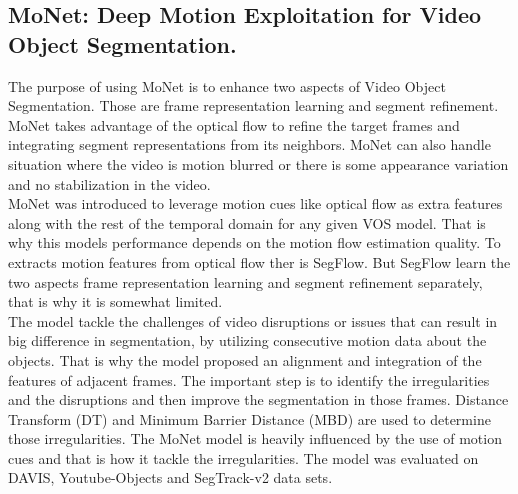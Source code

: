 \documentclass[conference]{IEEEtran}
\begin{document}
\subsection{MoNet: Deep Motion Exploitation for Video Object Segmentation.}
The purpose of using MoNet\cite{Xiao_2018_CVPR} is to enhance two aspects of Video Object Segmentation. Those are frame representation learning and segment refinement. MoNet takes advantage of the optical flow to refine the target frames and integrating segment representations from its neighbors. MoNet can also handle situation where the video is motion blurred or there is some appearance variation and no stabilization in the video. \\
MoNet was introduced to leverage motion cues like optical flow as extra features along with the rest of the temporal domain for any given VOS model. That is why this models performance depends on the motion flow estimation quality. To extracts motion features from optical flow ther is SegFlow\cite{cheng2017segflow}. But SegFlow learn the two aspects frame representation learning and segment refinement separately, that is why it is somewhat limited. \\
The model tackle the challenges of video disruptions or issues that can result in big difference in segmentation, by utilizing consecutive motion data about the objects. That is why the model proposed an alignment and integration of the features of adjacent frames. The important step is to identify the irregularities and the disruptions  and then improve the segmentation in those frames. 
Distance Transform (DT) and Minimum Barrier Distance (MBD) are used to determine those irregularities.
The MoNet model is heavily influenced by the use of motion cues and that is how it tackle the irregularities. The model was evaluated on DAVIS, Youtube-Objects and SegTrack-v2 data sets. 
\end{document}

